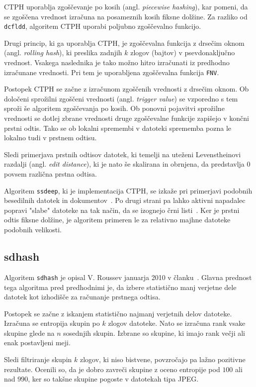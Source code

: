 \documentclass{acm_proc_article-sp}
\begin{document}
CTPH uporablja zgoščevanje po kosih (angl. \emph{piecewise hashing}), kar pomeni, da se zgoščena vrednost izračuna na posameznih kosih fiksne dolžine. Za razliko od \texttt{dcfldd}, algoritem CTPH uporabi poljubno zgoščevalno funkcijo.

Drugi princip, ki ga uporablja CTPH, je zgoščevalna funkcija z drsečim oknom (angl. \emph{rolling hash}), ki preslika zadnjih $k$ zlogov (bajtov) v psevdonaključno vrednost. Vsakega naslednika je tako možno hitro izračunati iz predhodno izračunane vrednosti. Pri tem je uporabljena zgoščevalna funkcija \texttt{FNV}.

Postopek CTPH se začne z izračunom zgoščenih vrednosti z drsečim oknom. Ob določeni sprožilni zgoščeni vrednosti (angl. \emph{trigger value}) se vzporedno s tem sproži še algoritem zgoščevanja po kosih. Ob ponovni pojavitvi sprožilne vrednosti se dotlej zbrane vrednosti druge zgoščevalne funkcije zapišejo v končni prstni odtis.
Tako se ob lokalni spremembi v datoteki sprememba pozna le lokalno tudi v prstnem odtisu.

Sledi primerjava prstnih odtisov datotek, ki temelji na uteženi Levenstheinovi razdalji (angl. \emph{edit distance}), ki je nato še skalirana in obrnjena, da predstavlja $0$ povsem različna prstna odtisa.

Algoritem \texttt{ssdeep}, ki je implementacija CTPH, se izkaže pri primerjavi podobnih besedilnih datotek in dokumentov~\cite{kornblum:ctph}. Po drugi strani pa lahko aktivni napadalec popravi "slabe" datoteke na tak način, da se izognejo črni listi~\cite{fbhash}. Ker je prstni odtis fiksne dolžine, je algoritem primeren le za relativno majhne datoteke podobnih velikosti.

\subsection{sdhash}
Algoritem \texttt{sdhash} je opisal V. Roussev januarja 2010 v članku~\cite{roussev:sdhash}. Glavna prednost tega algoritma pred predhodnimi je, da izbere statistično manj verjetne dele datotek kot izhodišče za računanje prstnega odtisa.

Postopek se začne z iskanjem statistično najmanj verjetnih delov datoteke. Izračuna se entropija skupin po $k$ zlogov datoteke. Nato se izračuna rank vsake skupine glede na $n$ sosednjih skupin. Izbrane so skupine, ki imajo rank večji ali enak postavljeni meji.

Sledi filtriranje skupin $k$ zlogov, ki niso bistvene, povzročajo pa lažno pozitivne rezultate. Ocenili so, da je dobro zavreči skupine z oceno entropije pod $100$ ali nad $990$, ker so takšne skupine pogoste v datotekah tipa JPEG.
\end{document}

